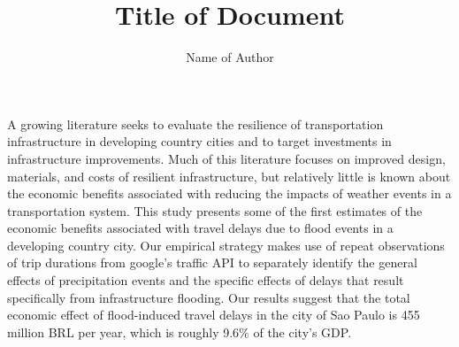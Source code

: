 \documentclass{article}
\title{Title of Document}
\author{Name of Author}
\begin{document}
\maketitle

\begin{Abstract}
A growing literature seeks to evaluate the resilience of transportation infrastructure in developing country cities and to target investments in infrastructure improvements.  Much of this literature focuses on improved design, materials, and costs of resilient infrastructure, but relatively little is known about the economic benefits associated with reducing the impacts of weather events in a transportation system.  This study presents some of the first estimates of the economic benefits associated with travel delays due to flood events in a developing country city.  Our empirical strategy makes use of repeat observations of trip durations from google's traffic API to separately identify the general effects of precipitation events and the specific effects of delays that result specifically from infrastructure flooding.  Our results suggest that the total economic effect of flood-induced travel delays in the city of Sao Paulo is 455 million BRL per year, which is roughly 9.6\% of the city's GDP. 
\end{Abstract}
\end{document}
